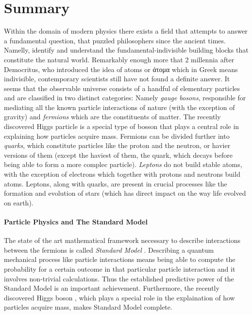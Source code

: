 \chapter*{Summary}
\chaptermark{}
%

Within the domain of modern physics there exists a field that attempts to answer a
fundamental question, that puzzled philosophers since the ancient times.
Namelly, identify and understand the fundamental-indivisible building blocks that constitute the natural world.
Remarkably enough more that 2 millennia after Democritus, who introduced
the idea of atoms or \textgreek{άτομα} which in Greek means indivisible,
contemporary scientists still have not found a definite answer.
It seems that the observable universe consists of a handful of elementary particles and are
classified in two distinct categories: Namely {\it gauge bosons}, responsible for mediating all
the known particle interactions of nature (with the exception of gravity) and {\it fermions}
which are the constituents of matter. The recently discovered Higgs particle \cite{higgs-cms,higgs-atlas}
is a special type of bosson that plays a central role in explaining how particles acquire mass.
Fermions can be divided further into {\it quarks}, which constitute particles like the proton and the neutron,
or havier versions of them (except the haviest of them, the \tquark quark, which decays before being able to form
 a more complec particle). {\it Leptons} do not
build stable atoms, with the exception of electrons which together with protons and neutrons
build atoms. Leptons, along with quarks, are present in crucial processes
like the formation and evolution of stars (which has direct impact on the way life evolved on earth).


\subsubsection{Particle Physics and The Standard Model}
The state of the art mathematical framework necessary to describe interactions between the
fermions is called \textit{Standard Model} \cite{sm-glashow,sm-weinberg,sm-salam}.
Describing a quantum mechanical process like particle interactions means being able
to compute the probability for a certain outcome in that particular particle interaction
and it involves non-trivial calculations. Thus the established predictive power of
the Standard Model is an important achievement. Furthermore, the recently
discovered Higgs boson \cite{higgs-cms,higgs-atlas}, which plays a special role in
the explaination of how particles acquire mass, makes Standard Model complete.

